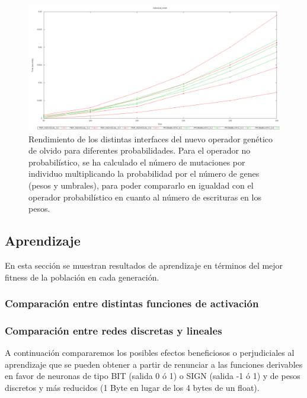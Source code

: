 \documentclass[11pt]{article}
\begin{document}
\begin{titlepage}
\begin{figure}[htb]
\centering
\includegraphics[width=\textwidth]{./img/Individual_reset.png}
\caption{\label{rendGenOlvido}Rendimiento de los distintas interfaces del nuevo operador genético de olvido para diferentes probabilidades. Para el operador no probabilístico, se ha calculado el número de mutaciones por individuo multiplicando la probabilidad por el número de genes (pesos y umbrales), para poder compararlo en igualdad con el operador probabilístico en cuanto al número de escrituras en los pesos.}
\end{figure}
\newpage
\subsection{Aprendizaje}
\label{sec-6-2}

  \label{aprendizaje}

En esta sección se muestran resultados de aprendizaje en términos del mejor fitness de la población en cada generación.
\subsubsection{Comparación entre distintas funciones de activación}
\label{sec-6-2-1}
\subsubsection{Comparaci\'on entre redes discretas y lineales}
\label{sec-6-2-2}

   \label{aprendDiscretLineales}

A continuación compararemos los posibles efectos beneficiosos o perjudiciales al aprendizaje que se pueden obtener a partir de renunciar a las funciones derivables en favor de neuronas de tipo BIT (salida 0 ó 1)  o SIGN (salida -1 ó 1) y de pesos discretos y más reducidos (1 Byte en lugar de los 4 bytes de un float).

\end{titlepage}
\end{document}

